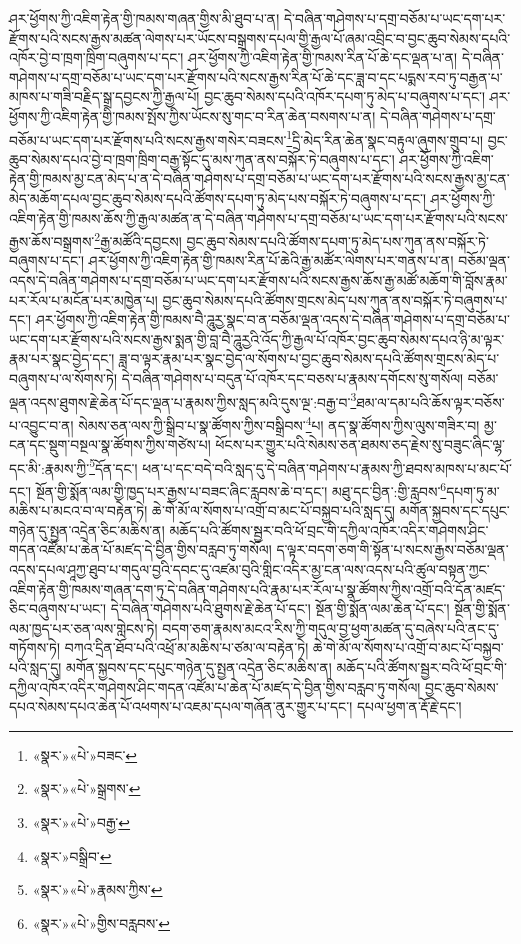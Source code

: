 ཤར་ཕྱོགས་ཀྱི་འཇིག་རྟེན་གྱི་ཁམས་གཞན་གྱིས་མི་ཐུབ་པ་ན། དེ་བཞིན་གཤེགས་པ་དགྲ་བཅོམ་པ་ཡང་དག་པར་རྫོགས་པའི་སངས་རྒྱས་མཚན་ལེགས་པར་ཡོངས་བསྒྲགས་དཔལ་གྱི་རྒྱལ་པོ་ཞམ་འབྲིང་བ་བྱང་ཆུབ་སེམས་དཔའི་འཁོར་བྱེ་བ་ཁྲག་ཁྲིག་བཞུགས་པ་དང་། ཤར་ཕྱོགས་ཀྱི་འཇིག་རྟེན་གྱི་ཁམས་རིན་པོ་ཆེ་དང་ལྡན་པ་ན། དེ་བཞིན་གཤེགས་པ་དགྲ་བཅོམ་པ་ཡང་དག་པར་རྫོགས་པའི་སངས་རྒྱས་རིན་པོ་ཆེ་དང་ཟླ་བ་དང་པདྨས་རབ་ཏུ་བརྒྱན་པ་མཁས་པ་གཟི་བརྗིད་སྒྲ་དབྱངས་ཀྱི་རྒྱལ་པོ། བྱང་ཆུབ་སེམས་དཔའི་འཁོར་དཔག་ཏུ་མེད་པ་བཞུགས་པ་དང་། ཤར་ཕྱོགས་ཀྱི་འཇིག་རྟེན་གྱི་ཁམས་སྤོས་ཀྱིས་ཡོངས་སུ་གང་བ་རིན་ཆེན་བསགས་པ་ན། དེ་བཞིན་གཤེགས་པ་དགྲ་བཅོམ་པ་ཡང་དག་པར་རྫོགས་པའི་སངས་རྒྱས་གསེར་བཟངས་\footnote{«སྣར་»«པེ་»བཟང་}དྲི་མེད་རིན་ཆེན་སྣང་བརྟུལ་ཞུགས་གྲུབ་པ། བྱང་ཆུབ་སེམས་དཔའ་བྱེ་བ་ཁྲག་ཁྲིག་བརྒྱ་སྟོང་དུ་མས་ཀུན་ནས་བསྐོར་ཏེ་བཞུགས་པ་དང་། ཤར་ཕྱོགས་ཀྱི་འཇིག་རྟེན་གྱི་ཁམས་མྱ་ངན་མེད་པ་ན་དེ་བཞིན་གཤེགས་པ་དགྲ་བཅོམ་པ་ཡང་དག་པར་རྫོགས་པའི་སངས་རྒྱས་མྱ་ངན་མེད་མཆོག་དཔལ་བྱང་ཆུབ་སེམས་དཔའི་ཚོགས་དཔག་ཏུ་མེད་པས་བསྐོར་ཏེ་བཞུགས་པ་དང་། ཤར་ཕྱོགས་ཀྱི་འཇིག་རྟེན་གྱི་ཁམས་ཆོས་ཀྱི་རྒྱལ་མཚན་ན་དེ་བཞིན་གཤེགས་པ་དགྲ་བཅོམ་པ་ཡང་དག་པར་རྫོགས་པའི་སངས་རྒྱས་ཆོས་བསྒྲགས་\footnote{«སྣར་»«པེ་»སྒྲགས་}རྒྱ་མཚོའི་དབྱངས། བྱང་ཆུབ་སེམས་དཔའི་ཚོགས་དཔག་ཏུ་མེད་པས་ཀུན་ནས་བསྐོར་ཏེ་བཞུགས་པ་དང་། ཤར་ཕྱོགས་ཀྱི་འཇིག་རྟེན་གྱི་ཁམས་རིན་པོ་ཆེའི་རྒྱ་མཚོར་ལེགས་པར་གནས་པ་ན། བཅོམ་ལྡན་འདས་དེ་བཞིན་གཤེགས་པ་དགྲ་བཅོམ་པ་ཡང་དག་པར་རྫོགས་པའི་སངས་རྒྱས་ཆོས་རྒྱ་མཚོ་མཆོག་གི་བློས་རྣམ་པར་རོལ་པ་མངོན་པར་མཁྱེན་པ། བྱང་ཆུབ་སེམས་དཔའི་ཚོགས་གྲངས་མེད་པས་ཀུན་ནས་བསྐོར་ཏེ་བཞུགས་པ་དང་། ཤར་ཕྱོགས་ཀྱི་འཇིག་རྟེན་གྱི་ཁམས་བཻ་ཌཱུརྱ་སྣང་བ་ན་བཅོམ་ལྡན་འདས་དེ་བཞིན་གཤེགས་པ་དགྲ་བཅོམ་པ་ཡང་དག་པར་རྫོགས་པའི་སངས་རྒྱས་སྨན་གྱི་བླ་བཻ་ཌཱུརྱའི་འོད་ཀྱི་རྒྱལ་པོ་འཁོར་བྱང་ཆུབ་སེམས་དཔའ་ཉི་མ་ལྟར་རྣམ་པར་སྣང་བྱེད་དང་། ཟླ་བ་ལྟར་རྣམ་པར་སྣང་བྱེད་ལ་སོགས་པ་བྱང་ཆུབ་སེམས་དཔའི་ཚོགས་གྲངས་མེད་པ་བཞུགས་པ་ལ་སོགས་ཏེ། དེ་བཞིན་གཤེགས་པ་བདུན་པོ་འཁོར་དང་བཅས་པ་རྣམས་དགོངས་སུ་གསོལ། བཅོམ་ལྡན་འདས་ཐུགས་རྗེ་ཆེན་པོ་དང་ལྡན་པ་རྣམས་ཀྱིས་སླད་མའི་དུས་ལྔ་:བརྒྱ་བ་\footnote{«སྣར་»«པེ་»བརྒྱ་}ཐམ་ལ་དམ་པའི་ཆོས་ལྟར་བཅོས་པ་འབྱུང་བ་ན། སེམས་ཅན་ལས་ཀྱི་སྒྲིབ་པ་སྣ་ཚོགས་ཀྱིས་བསྒྲིབས་\footnote{«སྣར་»བསྒྲིབ་}པ། ནད་སྣ་ཚོགས་ཀྱིས་ལུས་གཟིར་བ། མྱ་ངན་དང་སྡུག་བསྔལ་སྣ་ཚོགས་ཀྱིས་གཙེས་པ། ཕོངས་པར་གྱུར་པའི་སེམས་ཅན་ཐམས་ཅད་རྗེས་སུ་བཟུང་ཞིང་ལྷ་དང་མི་:རྣམས་ཀྱི་\footnote{«སྣར་»«པེ་»རྣམས་ཀྱིས་}དོན་དང་། ཕན་པ་དང་བདེ་བའི་སླད་དུ་དེ་བཞིན་གཤེགས་པ་རྣམས་ཀྱི་ཐབས་མཁས་པ་མང་པོ་དང་། སྔོན་གྱི་སྨོན་ལམ་གྱི་ཁྱད་པར་རྒྱས་པ་བཟང་ཞིང་རླབས་ཆེ་བ་དང་། མཐུ་དང་བྱིན་:གྱི་རླབས་\footnote{«སྣར་»«པེ་»གྱིས་བརླབས་}དཔག་ཏུ་མ་མཆིས་པ་མངའ་བ་ལ་བརྟེན་ཏེ། ཆེ་གེ་མོ་ལ་སོགས་པ་འགྲོ་བ་མང་པོ་བསྐྱབ་པའི་སླད་དུ། མགོན་སྐྱབས་དང་དཔུང་གཉེན་དུ་སྤྱན་འདྲེན་ཅིང་མཆིས་ན། མཆོད་པའི་ཚོགས་སྦྱར་བའི་ཕོ་བྲང་གི་དཀྱིལ་འཁོར་འདིར་གཤེགས་ཤིང་གདན་འཛོམ་པ་ཆེན་པོ་མཛད་དེ་བྱིན་གྱིས་བརླབ་ཏུ་གསོལ། ད་ལྟར་བདག་ཅག་གི་སྟོན་པ་སངས་རྒྱས་བཅོམ་ལྡན་འདས་དཔལ་ཤཱཀྱ་ཐུབ་པ་གདུལ་བྱའི་དབང་དུ་འཛམ་བུའི་གླིང་འདིར་མྱ་ངན་ལས་འདས་པའི་ཚུལ་བསྟན་ཀྱང་འཇིག་རྟེན་གྱི་ཁམས་གཞན་དག་ཏུ་དེ་བཞིན་གཤེགས་པའི་རྣམ་པར་རོལ་པ་སྣ་ཚོགས་ཀྱིས་འགྲོ་བའི་དོན་མཛད་ཅིང་བཞུགས་པ་ཡང་། དེ་བཞིན་གཤེགས་པའི་ཐུགས་རྗེ་ཆེན་པོ་དང་། སྔོན་གྱི་སྨོན་ལམ་ཆེན་པོ་དང་། སྔོན་གྱི་སྨོན་ལམ་ཁྱད་པར་ཅན་ལས་གླེངས་ཏེ། བདག་ཅག་རྣམས་མངའ་རིས་ཀྱི་གདུལ་བྱ་ཕྱག་མཚན་དུ་བཞེས་པའི་ནང་དུ་གཏོགས་ཏེ། བཀའ་དྲིན་ཐོབ་པའི་འཕྲོ་མ་མཆིས་པ་ཙམ་ལ་བརྟེན་ཏེ། ཆེ་གེ་མོ་ལ་སོགས་པ་འགྲོ་བ་མང་པོ་བསྐྱབ་པའི་སླད་དུ། མགོན་སྐྱབས་དང་དཔུང་གཉེན་དུ་སྤྱན་འདྲེན་ཅིང་མཆིས་ན། མཆོད་པའི་ཚོགས་སྦྱར་བའི་ཕོ་བྲང་གི་དཀྱིལ་འཁོར་འདིར་གཤེགས་ཤིང་གདན་འཛོམ་པ་ཆེན་པོ་མཛད་དེ་བྱིན་གྱིས་བརླབ་ཏུ་གསོལ། བྱང་ཆུབ་སེམས་དཔའ་སེམས་དཔའ་ཆེན་པོ་འཕགས་པ་འཇམ་དཔལ་གཞོན་ནུར་གྱུར་པ་དང་། དཔལ་ཕྱག་ན་རྡོ་རྗེ་དང་། 